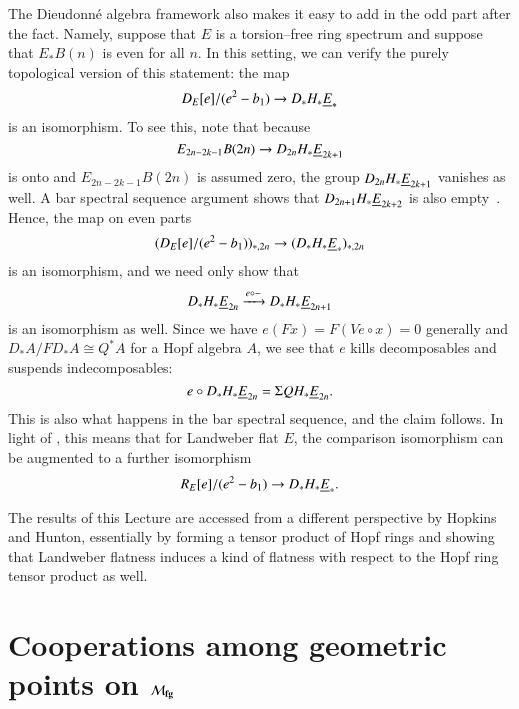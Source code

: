 \begin{remark}
The Dieudonn\'e algebra framework also makes it easy to add in the odd part after the fact.  Namely, suppose that $E$ is a torsion--free ring spectrum and suppose that $E_* B(n)$ is even for all $n$.  In this setting, we can verify the purely topological version of this statement: the map \[D_E[e] / (e^2 - b_1) \to D_* H_* \underline{\smash{E}}_{*}\] is an isomorphism.  To see this, note that because \[E_{2n-2k-1} B(2n) \to D_{2n} H_* \underline{\smash{E}}_{2k+1}\] is onto and $E_{2n-2k-1} B(2n)$ is assumed zero, the group $D_{2n} H_* \underline{\smash{E}}_{2k+1}$ vanishes as well.  A bar spectral sequence argument shows that $D_{2n+1} H_* \underline{\smash{E}}_{2k+2}$ is also empty~\cite[Lemma 11.5.1]{GoerssDieudonne}.  Hence, the map on even parts \[(D_E[e] / (e^2 - b_1))_{*, 2n} \to (D_* H_* \underline{\smash{E}}_{*})_{*, 2n}\] is an isomorphism, and we need only show that \[D_* H_* \underline{\smash{E}}_{2n} \xrightarrow{e \circ -} D_* H_* \underline{\smash{E}}_{2n+1}\] is an isomorphism as well.  Since we have $e(Fx) = F(Ve \circ x) = 0$ generally and $D_* A / FD_* A \cong Q^* A$ for a Hopf algebra $A$, we see that $e$ kills decomposables and suspends indecomposables: \[e \circ D_* H_* \underline{\smash{E}}_{2n} = \Sigma QH_* \underline{\smash{E}}_{2n}.\]  This is also what happens in the bar spectral sequence, and the claim follows.  In light of , this means that for Landweber flat $E$, the comparison isomorphism can be augmented to a further isomorphism \[R_E[e] / (e^2 - b_1) \to D_* H_* \underline{\smash{E}}_{*}.\]
\end{remark}

\begin{remark}
The results of this Lecture are accessed from a different perspective by Hopkins and Hunton, essentially by forming a tensor product of Hopf rings and showing that Landweber flatness induces a kind of flatness with respect to the Hopf ring tensor product as well.
\end{remark}










\section{Cooperations among geometric points on \texorpdfstring{$\mathcal{M}_{\mathbf{fg}}$}{Mfg}}\label{CoopnsForMoravaKandHA}


